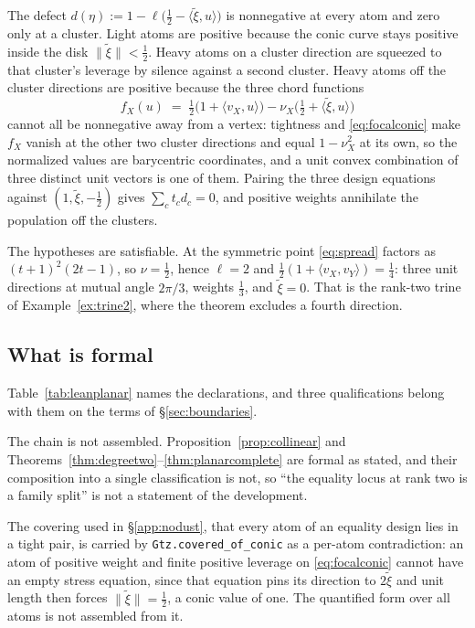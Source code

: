 The defect $d(\eta):=1-\ell\bigl(\tfrac12-\langle\tilde\xi,u\rangle\bigr)$
is nonnegative at every atom and zero only at a cluster.  Light atoms are
positive because the conic curve stays positive inside the disk
$\lVert\tilde\xi\rVert<\tfrac12$.  Heavy atoms on a cluster direction are
squeezed to that cluster's leverage by silence against a second cluster.
Heavy atoms off the cluster directions are positive because the three
chord functions
\[
  f_X(u)\;=\;\tfrac12\bigl(1+\langle v_X,u\rangle\bigr)
  -\nu_X\bigl(\tfrac12+\langle\tilde\xi,u\rangle\bigr)
\]
cannot all be nonnegative away from a vertex: tightness and
\eqref{eq:focalconic} make $f_X$ vanish at the other two cluster
directions and equal $1-\nu_X^2$ at its own, so the normalized values are
barycentric coordinates, and a unit convex combination of three distinct
unit vectors is one of them.  Pairing the three design equations against
$(1,\tilde\xi,-\tfrac12)$ gives $\sum_ct_cd_c=0$, and positive weights
annihilate the population off the clusters.

The hypotheses are satisfiable.  At the symmetric point \eqref{eq:spread}
factors as $(t+1)^2(2t-1)$, so $\nu=\tfrac12$, hence $\ell=2$ and
$\tfrac12(1+\langle v_X,v_Y\rangle)=\tfrac14$: three unit directions at
mutual angle $2\pi/3$, weights $\tfrac13$, and $\tilde\xi=0$.  That is the
rank-two trine of Example~\ref{ex:trine2}, where the theorem excludes a
fourth direction.

\subsection{What is formal}\label{app:planarformal}

Table~\ref{tab:leanplanar} names the declarations, and three
qualifications belong with them on the terms of \S\ref{sec:boundaries}.

The chain is not assembled.  Proposition~\ref{prop:collinear} and
Theorems~\ref{thm:degreetwo}--\ref{thm:planarcomplete} are formal as
stated, and their composition into a single classification is not, so
``the equality locus at rank two is a family split'' is not a statement of
the development.

The covering used in \S\ref{app:nodust}, that every atom of an equality
design lies in a tight pair, is carried by \texttt{Gtz.covered\_of\_conic}
as a per-atom contradiction: an atom of positive weight and finite
positive leverage on \eqref{eq:focalconic} cannot have an empty stress
equation, since that equation pins its direction to $2\tilde\xi$ and unit
length then forces $\lVert\tilde\xi\rVert=\tfrac12$, a conic value of one.
The quantified form over all atoms is not assembled from it.


